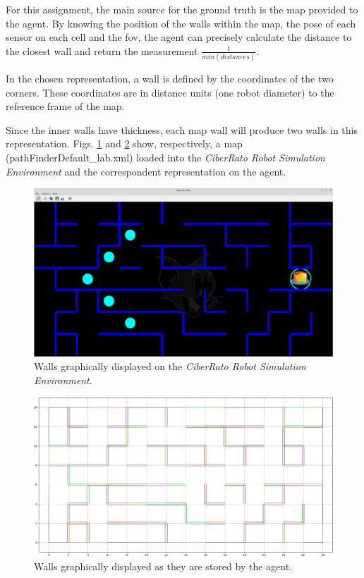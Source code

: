 \documentclass[runningheads]{llncs}
\begin{document}
For this assignment, the main source for the ground truth is the map provided to the agent. By knowing the position of the walls within the map, the pose of each sensor on each cell and the \gls{fov}, the agent can precisely calculate the distance to the closest wall and return the measurement $\frac{1}{min(distances)}$.

In the chosen representation, a wall is defined by the coordinates of the two corners. These coordinates are in distance units (one robot diameter) to the reference frame of the map.

Since the inner walls have thickness, each map wall will produce two walls in this representation. Figs. \ref{fig:map_walls_ciberrato} and \ref{fig:map_walls_agent} show, respectively, a map (pathFinderDefault\_lab.xml) loaded into the \emph{CiberRato Robot Simulation Environment} and the correspondent representation on the agent.

\begin{figure}
    \centering
    \includegraphics[width=\textwidth]{imgs/viewer_default_lab.png}
    \caption{Walls graphically displayed on the \emph{CiberRato Robot Simulation Environment}.} 
    \label{fig:map_walls_ciberrato}
\end{figure}
\FloatBarrier

\begin{figure}
    \centering
    \includegraphics[width=\textwidth]{imgs/agent_walls_map.png}
    \caption{Walls graphically displayed as they are stored by the agent.} 
    \label{fig:map_walls_agent}
\end{figure}
\FloatBarrier
\end{document}
